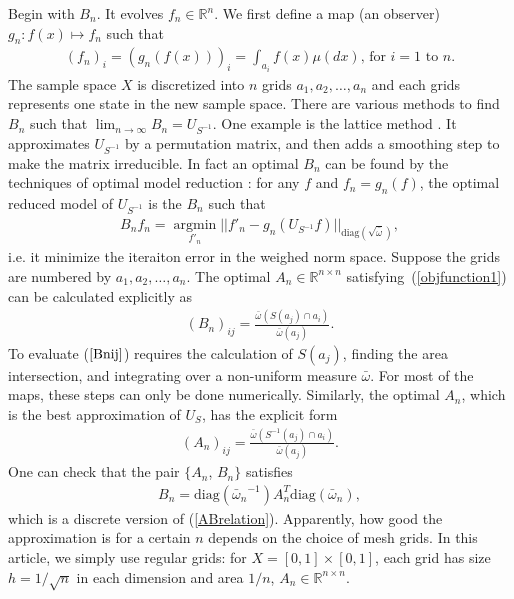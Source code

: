 Begin with $B_n$. It evolves $f_n \in
\mathbb{R}^n$. We first define a map (an observer) $g_n: f(x) \mapsto
f_n $ such that
\begin{eqnarray} 
  (f_n)_i = (g_n(f(x)))_i = \int_{a_i} f(x) \mu(dx) \mbox{, for }i = 1
  \mbox{ to } n.
\end{eqnarray}
The sample space $X$ is discretized into $n$ grids $a_1,a_2,\ldots,a_n$ and each grids represents one state in the new sample space. There are various methods to find $B_n$ such that $\lim_{n\rightarrow \infty}B_n = U_{S^{-1}}$. One example is the lattice method \cite{Pierrehumbert2000}. It approximates $U_{S^{-1}}$ by a permutation
matrix, and then adds a smoothing step to make the matrix irreducible. In fact an optimal $B_n$ can be found by the techniques
of optimal model reduction \cite{Beck2007, Froyland2001, Froyland1999}: for any $f$ and $f_n = g_n(f)$, the optimal reduced
model of $U_{S^{-1}}$ is the $B_n$ such that
\begin{eqnarray}
\label{objfunction1}
  B_n f_n = \operatorname*{argmin}_{{f'_n}} || {f'_n} -g_n(U_{S^{-1}} f) ||_{\text{diag}(\sqrt{\bar{\omega}})},
\end{eqnarray}
i.e. it minimize the iteraiton error in the weighed norm space. Suppose the grids are numbered by $a_1,a_2,\ldots, a_n$. The optimal $A_n\in \mathbb{R}^{n \times n}$ satisfying~(\ref{objfunction1}) can be calculated explicitly as
  \begin{eqnarray}
    \label{Bnij}
    (B_n)_{ij} =  \frac{\bar{\omega}(S(a_j)\cap a_i)}{\bar{\omega}(a_j)}.
  \end{eqnarray}
To evaluate ($\ref{Bnij}$) requires the calculation of $S(a_j)$,
finding the area intersection, and integrating over a non-uniform
measure $\bar{\omega}$. For most of the maps, these steps can only be
done numerically.  Similarly, the optimal $A_n$, which is the best approximation of $U_S$, has the explicit form
  \begin{eqnarray}
    \label{Anija}
    (A_n)_{ij} =  \frac{\bar{\omega}(S^{-1}(a_j)\cap a_i)}{\bar{\omega}(a_j)}.
   \end{eqnarray}
One can check that the pair $\{A_n$, $B_n\}$ satisfies
 \begin{eqnarray}
  \label{AnBnrelation}
         B_n = \text{diag}({\bar{\omega}_n}^{-1}) A_n^T \text{diag}(\bar{\omega}_n),
  \end{eqnarray}
which is a discrete version of (\ref{ABrelation}). Apparently, how good
the approximation is for a certain $n$ depends on the choice of mesh
grids. In this article, we simply use regular grids: for $X =
[0,1]\times[0,1]$, each grid has size $h=1/\sqrt{n}$ in each
dimension and area $1/n$, $A_n \in \mathbb{R}^{n \times n}$.



